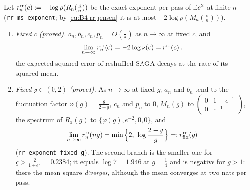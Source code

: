 \begin{proposition}\label{prop:B4-rr-ms}
Let $r^{\rm rr}_n(c):=-\log\rho(R_n(\frac cn))$ be the exact exponent per pass of $\mathbb{E} e^2$ at finite $n$ (\texttt{rr\_ms\_exponent}; by \eqref{eq:B4-rr-jensen} it is at most $-2\log\rho(M_n(\frac cn))$).
\begin{enumerate}[label=(\roman*)]
\item \emph{Fixed $c$ (proved).} $a_n,b_n,c_n,p_n=O(\frac1n)$ as $n\to\infty$ at fixed $c$, and
\[
\lim_{n\to\infty}r^{\rm rr}_n(c)=-2\log\nu(c)=r^{\rm rr}(c):
\]
the expected squared error of reshuffled SAGA decays at the rate of its squared mean.
\item \emph{Fixed $g\in(0,2)$ (proved).} As $n\to\infty$ at fixed $g$, $a_n$ and $b_n$ tend to the fluctuation factor $\varphi(g)=\frac g{2-g}$, $c_n$ and $p_n$ to $0$, $M_n(g)$ to $\begin{pmatrix}0&1-e^{-1}\\0&e^{-1}\end{pmatrix}$, the spectrum of $R_n(g)$ to $\{\varphi(g),e^{-2},0,0\}$, and
\[
\lim_{n\to\infty}r^{\rm rr}_n(ng)=\min\Big\{2,\ \log\frac{2-g}g\Big\}=:r^{\rm rr}_{\rm fix}(g)
\]
(\texttt{rr\_exponent\_fixed\_g}). The second branch is the smaller one for $g>\frac2{1+e^2}=0.2384$; it equals $\log7=1.946$ at $g=\frac14$ and is negative for $g>1$: there the mean square \emph{diverges}, although the mean converges at two nats per pass.
\end{enumerate}
\end{proposition}
